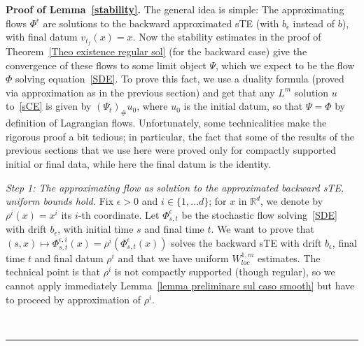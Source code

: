 \documentclass[a4paper,10pt]{article}
\newenvironment{proof}[1][Proof]{\noindent\textbf{#1.} }{\ \rule{0.5em}{0.5em}}
\newcommand{\mr}{\mathbb{R}}
\newcommand{\eps}{\epsilon}
\begin{document}
\begin{proof}[Proof of Lemma~\ref{stability}]
The general idea is simple: The approximating flows $\Phi^\eps$ are solutions to the backward approximated sTE (with $b_\eps$ instead of $b$), with final datum $v_{t_f}(x)=x$. Now the stability estimates in the proof of Theorem~\ref{Theo existence regular sol} (for the backward case) give the convergence of these flows to some limit object $\Psi$, which we expect to be the flow $\Phi$ solving equation~\eqref{SDE}. To prove this fact, we use a duality formula (proved via approximation as in the previous section) and get that any $L^m$ solution $u$ to~\eqref{sCE} is given by $(\Psi_t)_\#u_0$, where $u_0$ is the initial datum, so that $\Psi=\Phi$ by definition of Lagrangian flows. Unfortunately, some technicalities make the rigorous proof a bit tedious; in particular, the fact that some of the results of the previous sections that we use here were proved only for compactly supported initial or final data, while here the final datum is the identity.

\emph{Step 1: The approximating flow as solution to the approximated backward sTE, uniform bounds hold.} Fix $\eps>0$ and $i \in \{1,\ldots d\}$; for $x$ in $\mr^d$, we denote by $\rho^{i}(x)=x^i$ its $i$-th coordinate. Let $\Phi^\eps_{s,t}$ be the stochastic flow solving~\eqref{SDE} with drift $b_\eps$, with initial time $s$ and final time $t$. We want to prove that $(s,x)\mapsto\Phi^{\eps,i}_{s,t}(x)=\rho^i(\Phi^\eps_{s,t}(x))$ solves the backward sTE with drift $b_\eps$, final time $t$ and final datum $\rho^i$ and that we have uniform $W^{1,m}_{loc}$ estimates. The technical point is that $\rho^i$ is not compactly supported (though regular), so we cannot apply immediately Lemma~\ref{lemma preliminare sul caso smooth} but have to proceed by approximation of $\rho^i$.


\end{proof}
\end{document}
